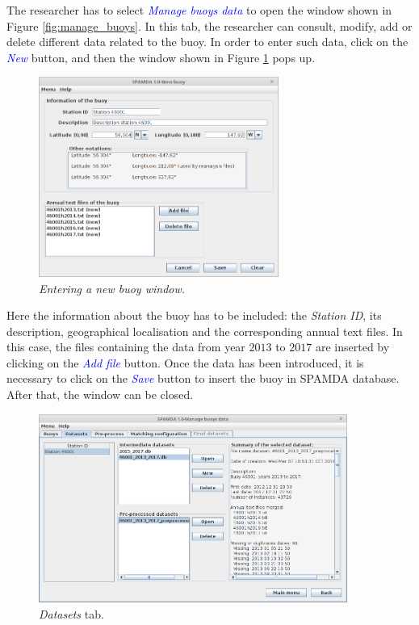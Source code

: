 \documentclass[energies,article,submit,moreauthors,pdftex]{Definitions/mdpi}
\begin{document}
		The researcher has to select \textcolor{blue}{\textit{Manage buoys data}} to open the window shown in Figure \ref{fig:manage_buoys}. In this tab, the researcher can consult, modify, add or delete different data related to the buoy. In order to enter such data, click on the \textcolor{blue}{\textit{New}} button, and then the window shown in Figure \ref{fig:new_buoy} pops up.
		
		\begin{figure}[H]
			\centering
			\includegraphics[width=0.70\textwidth]{figures/FigureNew_buoy.png}
			\caption{\em{Entering a new buoy} window.}\label{fig:new_buoy}
		\end{figure}
		
		Here the information about the buoy has to be included: the \textit{Station ID}, its description, geographical localisation and the corresponding annual text files. In this case, the files containing the data from year $2013$ to $2017$ are inserted by clicking on the \textcolor{blue}{\textit{Add file}} button. Once the data has been introduced, it is necessary to click on the \textcolor{blue}{\textit{Save}} button to insert the buoy in SPAMDA database. After that, the window can be closed.  
		
		\begin{figure}[H]
			\centering
			\includegraphics[width=0.90\textwidth]{figures/FigureDatasets.png}
			\caption{\textit{Datasets} tab.}\label{fig:show_datasets}
		\end{figure}
		
\end{document}
